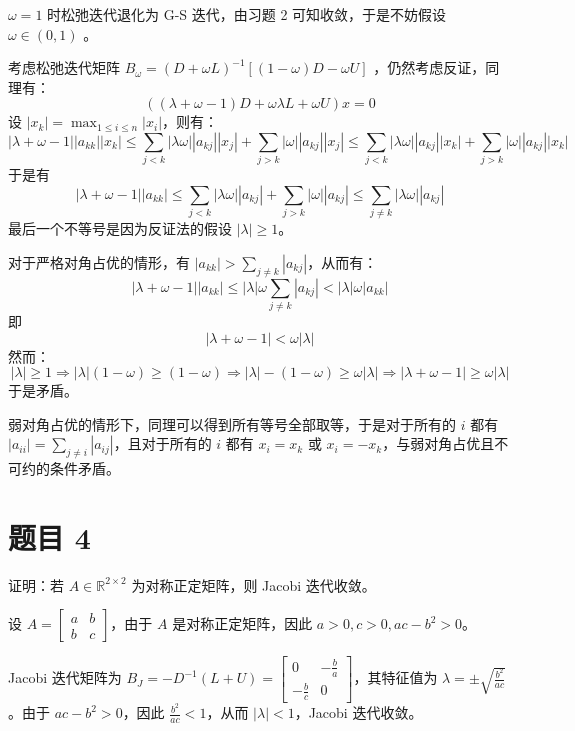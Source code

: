 \documentclass{article}
\begin{document}
\begin{solution}
  $\omega = 1$ 时松弛迭代退化为 G-S 迭代，由习题 2 可知收敛，于是不妨假设 $\omega \in (0,1)$ 。

  考虑松弛迭代矩阵 $B_{\omega} = (D + \omega L)^{-1}[(1-\omega)D - \omega U]$
  ，仍然考虑反证，同理有：
  \[
    ((\lambda +\omega - 1) D + \omega \lambda L + \omega U) x = 0
  \]
  设 $|x_k| = \max_{1 \leq i \leq n} |x_{i}|$，则有：
  \[
    |\lambda + \omega - 1| |a_{kk}| |x_k| \leq \sum_{j < k}
    |\lambda\omega| |a_{kj}| |x_j| + \sum_{j > k} |\omega| |a_{kj}|
    |x_j| \leq \sum_{j < k} |\lambda\omega| |a_{kj}| |x_k| +
    \sum_{j > k} |\omega| |a_{kj}| |x_k|
  \]
  于是有
  \[
    |\lambda + \omega - 1| |a_{kk}| \leq \sum_{j<k}
    |\lambda\omega||a_{kj}| + \sum_{j>k} |\omega||a_{kj}| \leq
    \sum_{j \neq k} |\lambda\omega||a_{kj}|
  \]
  最后一个不等号是因为反证法的假设 $|\lambda| \geq 1$。

  对于严格对角占优的情形，有 $|a_{kk}| > \sum_{j \neq k} |a_{kj}|$，从而有：
  \[
    |\lambda + \omega - 1||a_{kk}| \leq |\lambda| \omega \sum_{j\neq
    k}|a_{kj}| < |\lambda| \omega |a_{kk}|
  \]
  即
  \[
    |\lambda + \omega - 1| < \omega |\lambda|
  \]
  然而：
  \[
    |\lambda| \geq 1 \Rightarrow |\lambda| (1-\omega) \geq (1-\omega)
    \Rightarrow |\lambda| - (1-\omega) \geq \omega |\lambda|
    \Rightarrow |\lambda + \omega - 1| \geq \omega |\lambda|
  \]
  于是矛盾。

  弱对角占优的情形下，同理可以得到所有等号全部取等，于是对于所有的 $i$ 都有 $|a_{ii}| = \sum_{j \neq i}
  |a_{ij}|$，且对于所有的 $i$ 都有 $x_i = x_k$ 或 $x_i = -x_k$，与弱对角占优且不可约的条件矛盾。

\end{solution}

\section{题目 4}

证明：若 $A \in \mathbb{R}^{2\times 2}$ 为对称正定矩阵，则 Jacobi 迭代收敛。

\begin{solution}
  设 $A =
  \begin{bmatrix} a & b \\ b & c
  \end{bmatrix}$，由于 $A$ 是对称正定矩阵，因此 $a > 0, c > 0, ac - b^2 > 0$。

  Jacobi 迭代矩阵为 $B_J = -D^{-1}(L + U) =
  \begin{bmatrix} 0 & -\frac{b}{a} \\ -\frac{b}{c} & 0
  \end{bmatrix}$，其特征值为 $\lambda = \pm \sqrt{\frac{b^2}{ac}}$。由于 $ac -
  b^2 > 0$，因此 $\frac{b^2}{ac} < 1$，从而 $|\lambda| < 1$，Jacobi 迭代收敛。
\end{solution}
\end{document}
